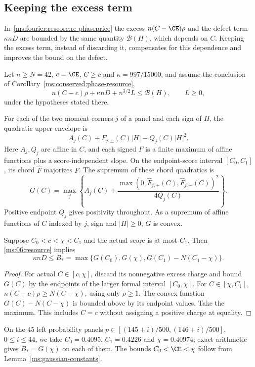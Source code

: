 \subsection{Keeping the excess term}\label{ms:resources}

In~\eqref{ms:fourier:rescore:re-phaseprice} the excess $n(C-\CE)\rho$ and
the defect term $\kappa nD$ are bounded by the same quantity $\mathcal B(H)$,
which depends on $C$. Keeping the excess term, instead of discarding it,
compensates for this dependence and improves the bound on the defect.

Let $n\ge N=42$, $c=\CE$, $C\ge c$ and $\kappa=997/15000$, and assume the
conclusion of Corollary~\ref{ms:conserved:phase-resource},
\begin{equation}\label{ms:06:resource}
 n(C-c)\rho+\kappa nD+n^{3/2}L\le\mathcal B(H),\qquad L\ge0,
\end{equation}
under the hypotheses stated there.

For each of the two moment corners $j$ of a panel and each sign of $H$,
the quadratic upper envelope is
\[
 A_j(C)+F_{j,\pm}(C)|H|-Q_j(C)|H|^2.
\]
Here $A_j,Q_j$ are affine in $C$, and each signed $F$ is a finite maximum
of affine functions plus a score-independent slope. On the endpoint-score
interval $[C_0,C_1]$, its chord $\widehat F$ majorizes $F$.
The supremum of these chord quadratics is
\[
 G(C)=\max_j\left\{A_j(C)+
 \frac{\max(0,\widehat F_{j,+}(C),\widehat F_{j,-}(C))^2}{4Q_j(C)}
 \right\}.
\]
Positive endpoint $Q_j$ gives positivity throughout. As a supremum of
affine functions of $C$ indexed by $j$, sign and $|H|\ge0$, $G$ is convex.

\begin{lemma}\label{ms:06:charge}
Suppose $C_0<c<\chi<C_1$ and the actual score is at most $C_1$.
Then \eqref{ms:06:resource} implies
\[
 \kappa nD\le
 B_*=\max\{G(C_0),G(\chi),G(C_1)-N(C_1-\chi)\}.
\]
\end{lemma}
\begin{proof}
For actual $C\in[c,\chi]$, discard its nonnegative excess charge and
bound $G(C)$ by the endpoints of the larger formal interval $[C_0,\chi]$.
For $C\in[\chi,C_1]$,
$n(C-c)\rho\ge N(C-\chi)$, using only $\rho\ge1$.
The convex function $G(C)-N(C-\chi)$ is bounded above by its endpoint
values. Take the maximum. This includes $C=c$ without assigning a
positive charge at equality.
\end{proof}

On the $45$ left probability panels $p\in[(145+i)/500,(146+i)/500]$,
$0\le i\le44$, we take $C_0=0.4095$, $C_1=0.4226$ and $\chi=0.40974$;
exact arithmetic gives $B_*=G(\chi)$ on each of them.
The bounds $C_0<\CE<\chi$ follow from Lemma~\ref{ms:gaussian-constants}.

